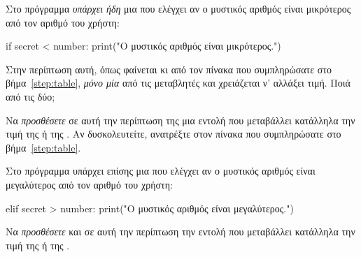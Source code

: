 \documentclass[a4paper,11pt,oneside]{book}
\begin{document}
\begin{step}

Στο πρόγραμμα \emph{υπάρχει ήδη} μια  που ελέγχει αν ο μυστικός αριθμός είναι μικρότερος από τον αριθμό του χρήστη:

\begin{pyplain}
    if secret < number:
        print("Ο μυστικός αριθμός είναι μικρότερος.")
\end{pyplain}

Στην περίπτωση αυτή, όπως φαίνεται κι από τον πίνακα που συμπληρώσατε στο βήμα~\ref{step:table}, \emph{μόνο μία} από τις μεταβλητές  και  χρειάζεται ν' αλλάξει τιμή. Ποιά από τις δύο;

\marginnote[14pt]{\icondiscuss}
\dottedline

Να \emph{προσθέσετε} σε αυτή την περίπτωση της  μια εντολή που μεταβάλλει κατάλληλα την τιμή της  ή της . Αν δυσκολευτείτε, ανατρέξτε στον πίνακα που συμπληρώσατε στο βήμα~\ref{step:table}.

Στο πρόγραμμα υπάρχει επίσης μια  που ελέγχει αν ο μυστικός αριθμός είναι μεγαλύτερος από τον αριθμό του χρήστη:

\begin{pyplain}
    elif secret > number:
        print("Ο μυστικός αριθμός είναι μεγαλύτερος.")
\end{pyplain}

Να \emph{προσθέσετε} και σε αυτή την περίπτωση την εντολή που μεταβάλλει κατάλληλα την τιμή της  ή της . 






\end{step}
\end{document}

